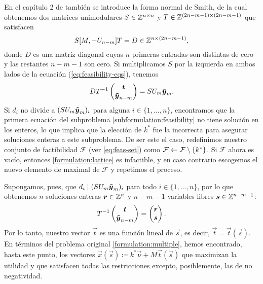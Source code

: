 En el capítulo 2 de \cite{morris} también se introduce la forma normal de Smith, de la cual
obtenemos dos matrices unimodulares $S \in \mathbb{Z}^{n \times n}$ y $T \in \mathbb{Z}^{(2n - m - 1) \times (2n - m
-1)}$ que satisfacen
\begin{equation*}
	S[M, -U_{n-m}]T = D \in \mathbb{Z}^{n \times (2n - m - 1)},
\end{equation*}
donde $D$ es una matriz diagonal cuyas $n$ primeras entradas son distintas de cero y las restantes
$n - m - 1$ son cero. Si multiplicamos $S$ por la izquierda en ambos lados de la ecuación
(\ref{eq:feasibility-eqs}), tenemos
\begin{equation}
	\label{eq:sum}
	DT^{-1}\begin{pmatrix} \boldsymbol{t} \\ \boldsymbol{\tilde{y}}_{n-m} \end{pmatrix}
	= SU_m\boldsymbol{\tilde{y}}_{m}.
\end{equation}
Si $d_i$ no divide a $(SU_m\boldsymbol{\tilde{y}}_{m})_i$ para alguna $i \in \lbrace 1, \ldots, n \rbrace$,
encontramos que la primera ecuación del subproblema \eqref{subformulation:feasibility} no tiene
solución en los enteros, lo que implica que la elección de $k^*$ fue la incorrecta para asegurar
soluciones enteras a este subproblema. De ser este el caso, redefinimos nuestro conjunto de
factibilidad $\mathcal{F}$ (ver \eqref{eq:feas-set}) como $\mathcal{F} \leftarrow \mathcal{F}
\setminus \lbrace k^* \rbrace$. Si $\mathcal{F}$ ahora es vacío, entonces \eqref{formulation:lattice} es
infactible, y en caso contrario escogemos el nuevo elemento de maximal de $\mathcal{F}$ y repetimos el proceso.

Supongamos, pues, que $d_i \mid (SU_m\boldsymbol{\tilde{y}}_{m})_i$ para todo $i \in \lbrace 1, \ldots,
n\rbrace$, por lo que obtenemos $n$ soluciones enteras $\boldsymbol{r} \in \mathbb{Z}^n$ y $n - m - 1$ variables
libres $\boldsymbol{s} \in \mathbb{Z}^{n-m-1}$:
\begin{equation*}
	T^{-1}\begin{pmatrix} \boldsymbol{t} \\ \boldsymbol{\tilde{y}}_{n-m} \end{pmatrix}
	=
	\begin{pmatrix} \boldsymbol{r} \\ \boldsymbol{s} \end{pmatrix}.
\end{equation*}
Por lo tanto, nuestro vector $\vec{t}$ es una función lineal de $\vec{s}$, es decir, $\vec{t} =
\vec{t}(\vec{s})$. En términos del problema original \eqref{formulation:multiple}, hemos encontrado,
hasta este punto, los vectores $\vec{x}(\vec{s}) \coloneq k^*\vec{\nu} + M\vec{t}(\vec{s})$ que
maximizan la utilidad y que satisfacen todas las restricciones excepto, posiblemente, las de no
negatividad.

